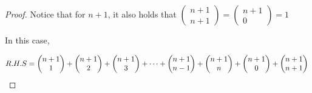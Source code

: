 \documentclass[12pt]{article}
\begin{document}
\begin{proof}
    \vspace*{0.3cm}
    \hspace*{1.2cm}
    Notice that for $n+1$, it also holds that $\begin{pmatrix}
        n+1 \\
        n+1
    \end{pmatrix} = \begin{pmatrix}
        n+1 \\
        0
    \end{pmatrix} = 1 $

    \vspace*{0.3cm}
    \hspace*{1.2cm}
    In this case,

    
       \[ R.H.S   = \begin{pmatrix}
            n+1  \\
            1
        \end{pmatrix}  + \begin{pmatrix}
                  n+1 \\
                  2
              
              \end{pmatrix} +  \begin{pmatrix}
                                           n+1 \\
                                           3 
        
              \end{pmatrix} 
               + \cdots + \begin{pmatrix}
                      n+1 \\
                      n-1
                  
                  \end{pmatrix} + \begin{pmatrix}
                                               n+1 \\
                                               n 
            
                 
                  \end{pmatrix} + \begin{pmatrix}
                    n+1 \\
                    0
                  \end{pmatrix} + \begin{pmatrix}
                    n+1 \\
                    n+1
                  \end{pmatrix} \\ \]


\end{proof}
\end{document}
